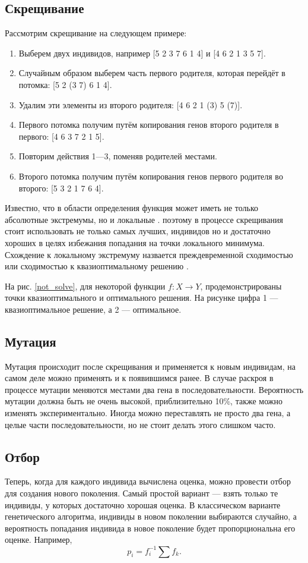 \documentclass[14pt]{extarticle}
\begin{document}
	\subsection{Скрещивание}
	Рассмотрим скрещивание на следующем примере:
	\begin{enumerate}
		\item Выберем двух индивидов, например [5 2 3 7 6 1 4] и [4 6 2 1 3 5 7].
		\item Случайным образом выберем часть первого родителя, которая перейдёт в потомка: [5
		2 (3 7) 6 1 4].
		\item Удалим эти элементы из второго родителя: [4 6 2 1 (3) 5 (7)].
		\item Первого потомка получим путём копирования генов второго родителя в первого: [4 6
		3 7 2 1 5].
		\item Повторим действия 1---3, поменяв родителей местами.
		\item Второго потомка получим путём копирования генов первого родителя во второго: [5
		3 2 1 7 6 4].
	\end{enumerate}

	Известно, что в области определения функция может иметь не только абсолютные экстремумы, но и локальные \cite{Kudryavcev}. поэтому в процессе скрещивания стоит использовать не только самых лучших, индивидов но и достаточно хороших в целях избежания попадания на точки локального минимума. Схождение к локальному экстремуму назвается преждевременной сходимостью или сходимостью к квазиоптимальному решению \cite{GA}.


	На рис. \ref{not_solve}, для некоторой функции $f:X\to Y$, продемонстрированы точки квазиоптимального и оптимального решения. На рисунке цифра 1 --- квазиоптимальное решение, а 2 --- оптимальное. 
	
	\subsection{Мутация}
	Мутация происходит после скрещивания и применяется к новым индивидам, на самом деле можно применять и к появившимся ранее. В случае раскроя в процессе мутации меняются местами два гена в последовательности. Вероятность мутации должна быть не очень высокой, приблизительно 10\%, также можно изменять экспериментально. Иногда можно переставлять не просто два гена, а целые части последовательности, но не стоит делать этого слишком часто.
	\subsection{Отбор}
	Теперь, когда для каждого индивида вычислена оценка, можно провести отбор для создания нового поколения. Самый простой вариант --- взять только те индивиды, у которых достаточно хорошая оценка. В классическом варианте генетического алгоритма, индивиды в новом поколении выбираются случайно, а вероятность попадания индивида в новое поколение будет пропорциональна его оценке. Например,
	\begin{equation}
		p_i = f_i^{-1}\sum f_k.
	\end{equation}
\end{document}

